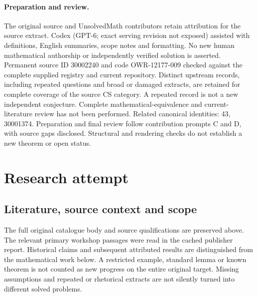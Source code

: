 \documentclass[11pt]{article}
\begin{document}
\paragraph{Preparation and review.}
The original source and UnsolvedMath contributors retain attribution for the source extract. Codex (GPT-6; exact serving revision not exposed) assisted with definitions, English summaries, scope notes and formatting. No new human mathematical authorship or independently verified solution is asserted. Permanent source ID 30002240 and code OWR-12177-009 checked against the complete supplied registry and current repository. Distinct upstream records, including repeated questions and broad or damaged extracts, are retained for complete coverage of the source CS category. A repeated record is not a new independent conjecture. Complete mathematical-equivalence and current-literature review has not been performed. Related canonical identities: 43, 30001374. Preparation and final review follow contribution prompts C and D, with source gaps disclosed. Structural and rendering checks do not establish a new theorem or open status.
\label{end:30002240}

\section{Research attempt}
\subsection{Literature, source context and scope}
The full original catalogue body and source qualifications are preserved above. The relevant primary workshop passages were read in the cached publisher report. Historical claims and subsequent attributed results are distinguished from the mathematical work below. A restricted example, standard lemma or known theorem is not counted as new progress on the entire original target. Missing assumptions and repeated or rhetorical extracts are not silently turned into different solved problems.
\end{document}
